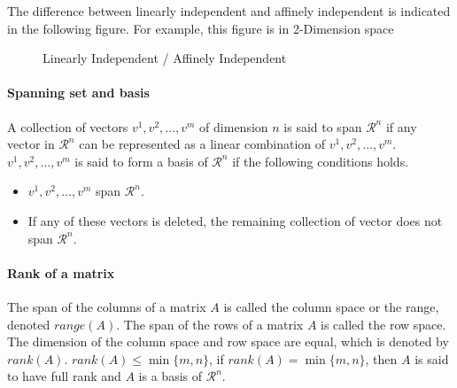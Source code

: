                 The difference between linearly independent and affinely independent is indicated in the following figure. For example, this figure is in 2-Dimension space
                \begin{figure}[h]
                    \centering
                    \caption{Linearly Independent / Affinely Independent}
                \end{figure}

            \paragraph{Spanning set and basis}
                A collection of vectors $v^1, v^2, \dots, v^m$ of dimension $n$ is said to span $\mathcal{R}^n$ if any vector in $\mathcal{R}^n$ can be represented as a linear combination of $v^1, v^2, \dots, v^m$. $v^1, v^2, \dots, v^m$ is said to form a basis of $\mathcal{R}^n$ if the following conditions holds.
                \begin{itemize}
                    \item $v^1, v^2, \dots, v^m$ span $\mathcal{R}^n$.
                    \item If any of these vectors is deleted, the remaining collection of vector does not span $\mathcal{R}^n$.
                \end{itemize}

            \paragraph{Rank of a matrix}
                The span of the columns of a matrix $A$ is called the column space or the range, denoted $range(A)$. The span of the rows of a matrix $A$ is called the row space. The dimension of the column space and row space are equal, which is denoted by $rank(A)$. $rank(A) \le \min\{m,n\}$, if $rank(A) = \min\{m,n\}$, then $A$ is said to have full rank and $A$ is a basis of $\mathcal{R}^n$.

